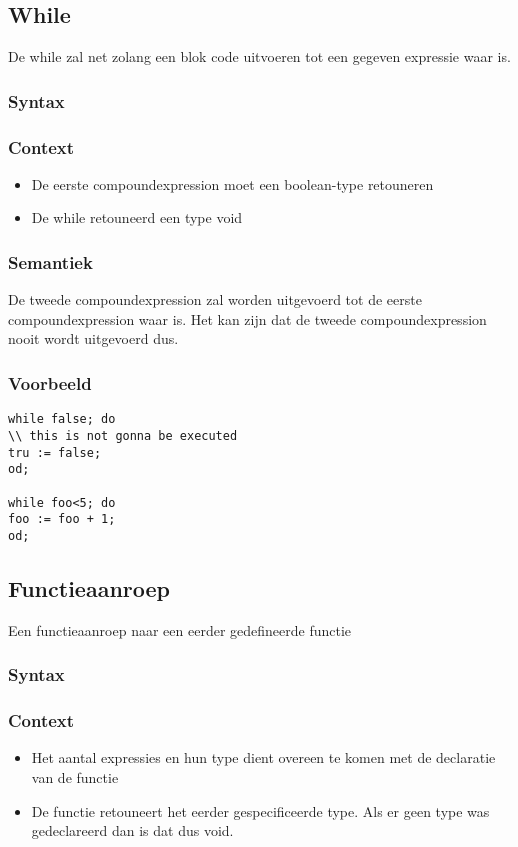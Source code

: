 \documentclass[]{article}
\begin{document}
\subsection{While}
De while zal net zolang een blok code uitvoeren tot een gegeven expressie waar is.
\subsubsection{Syntax}

\subsubsection{Context}
\begin{itemize}
\item De eerste compoundexpression moet een boolean-type retouneren
\item De while retouneerd een type void
\end{itemize}
\subsubsection{Semantiek}
De tweede compoundexpression zal worden uitgevoerd tot de eerste compoundexpression waar is. Het kan zijn dat de tweede compoundexpression nooit wordt uitgevoerd dus.
\subsubsection{Voorbeeld}
\begin{lstlisting}[style=SELMA]
while false; do 
\\ this is not gonna be executed
tru := false;
od;

while foo<5; do
foo := foo + 1;
od;
\end{lstlisting}

\subsection{Functieaanroep}
Een functieaanroep naar een eerder gedefineerde functie
\subsubsection{Syntax}

\subsubsection{Context}
\begin{itemize}
\item Het aantal expressies en hun type dient overeen te komen met de declaratie van de functie
\item De functie retouneert het eerder gespecificeerde type. Als er geen type was gedeclareerd dan is dat dus void.
\end{itemize}
\end{document}
